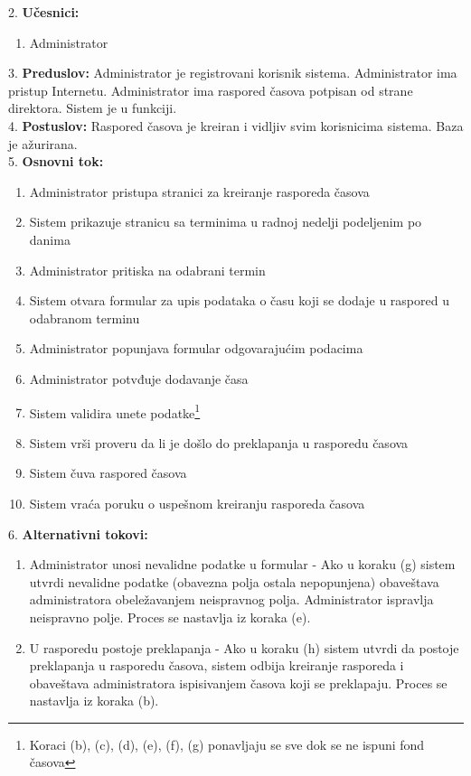 \documentclass{article}
\begin{document}
2. \textbf{Učesnici:}
\begin{enumerate} [label=(\alph*)]
\item Administrator
\end{enumerate} 

3. \textbf{Preduslov:} Administrator je registrovani korisnik sistema. Administrator ima pristup Internetu. Administrator ima raspored časova potpisan od strane direktora. Sistem je u funkciji. \\

4. \textbf{Postuslov:} Raspored časova je kreiran i vidljiv svim korisnicima sistema. Baza je ažurirana. \\

5. \textbf{Osnovni tok:} 
\begin{enumerate} [label=(\alph*)]
\item Administrator pristupa stranici za kreiranje rasporeda časova
\item Sistem prikazuje stranicu sa terminima u radnoj nedelji podeljenim po danima
\item Administrator pritiska na odabrani termin
\item Sistem otvara formular za upis podataka o času koji se dodaje u raspored u odabranom terminu
\item Administrator popunjava formular odgovarajućim podacima
\item Administrator potvđuje dodavanje časa 
\item Sistem validira unete podatke\footnote{Koraci (b), (c), (d), (e), (f), (g) ponavljaju se sve dok se ne ispuni fond časova}
\item Sistem vrši proveru da li je došlo do preklapanja u rasporedu časova
\item Sistem čuva raspored časova
\item Sistem vraća poruku o uspešnom kreiranju rasporeda časova
\end{enumerate}

6. \textbf{Alternativni tokovi:}
\begin{enumerate} [label=(\roman*)]
\item Administrator unosi nevalidne podatke u formular - Ako u koraku (g) sistem utvrdi nevalidne podatke (obavezna polja ostala nepopunjena) obaveštava administratora obeležavanjem neispravnog polja. Administrator ispravlja neispravno polje. Proces se nastavlja iz koraka (e).
\item U rasporedu postoje preklapanja - Ako u koraku (h) sistem utvrdi da postoje preklapanja u rasporedu časova, sistem odbija kreiranje rasporeda i obaveštava administratora ispisivanjem časova koji se preklapaju. Proces se nastavlja iz koraka (b).
\end{enumerate}
\end{document}
